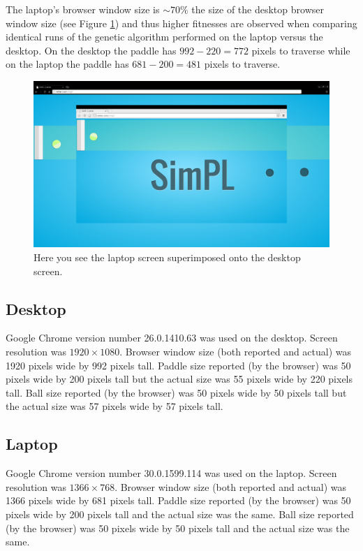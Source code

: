 \documentclass[a4paper,10pt]{article}
\begin{document}
The laptop's browser window size is $\sim70\%$ the size of the desktop browser window size (see Figure \ref{fig:platform_sizes}) and thus higher fitnesses are observed when comparing identical runs of the genetic algorithm performed on the laptop versus the desktop. On the desktop the paddle has $992-220=772$ pixels to traverse while on the laptop the paddle has $681-200=481$ pixels to traverse.

\begin{figure}[H]  
  \centering
  \includegraphics[width=.666\textwidth]{figures/platform_sizes.png}
  \caption{Here you see the laptop screen superimposed onto the desktop screen.}
  \label{fig:platform_sizes}
\end{figure}


\subsection{Desktop}

Google Chrome version number 26.0.1410.63 was used on the desktop. Screen resolution was $1920\times1080$. Browser window size (both reported and actual) was 1920 pixels wide by 992 pixels tall. Paddle size reported (by the browser) was 50 pixels wide by 200 pixels tall but the actual size was 55 pixels wide by 220 pixels tall. Ball size reported (by the browser) was 50 pixels wide by 50 pixels tall but the actual size was 57 pixels wide by 57 pixels tall.

\subsection{Laptop}

Google Chrome version number 30.0.1599.114 was used on the laptop. Screen resolution was $1366\times768$. Browser window size (both reported and actual) was 1366 pixels wide by 681 pixels tall. Paddle size reported (by the browser) was 50 pixels wide by 200 pixels tall and the actual size was the same. Ball size reported (by the browser) was 50 pixels wide by 50 pixels tall and the actual size was the same. 
\end{document}
